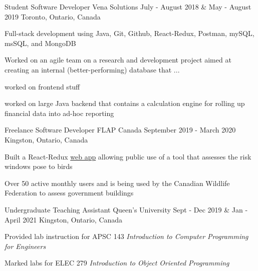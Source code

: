 \begin{cventries}
  \cventry
    {Student Software Developer} %
    {Vena Solutions} %
    {July - August 2018 \& May - August 2019} %
    {Toronto, Ontario, Canada} %
    {
      \begin{cvitems} %
        \item {Full-stack development using Java, Git, Github, React-Redux, Postman, mySQL, msSQL, and MongoDB}
        \item{Worked on an agile team on a research and development project aimed at creating an internal (better-performing) database that ...}
        \item{worked on frontend stuff}
        \item{worked on large Java backend that contains a calculation engine for rolling up financial data into ad-hoc reporting}
      \end{cvitems}
    }

  \cventry
    {Freelance Software Developer} %
    {FLAP Canada} %
    {September 2019 - March 2020} %
    {Kingston, Ontario, Canada} %
    {
      \begin{cvitems} %
        \item {Built a React-Redux \href{https://www.flapapp.ca/}{web app} allowing public use of a tool that assesses the risk windows pose to birds}
        \item{Over 50 active monthly users and is being used by the Canadian Wildlife Federation to assess government buildings}
      \end{cvitems}
    }

  \cventry
    {Undergraduate Teaching Assistant} %
    {Queen's University} %
    {Sept - Dec 2019 \& Jan - April 2021} %
    {Kingston, Ontario, Canada} %
    {
      \begin{cvitems} %
        \item{Provided lab instruction for APSC 143 \textit{Introduction to Computer Programming for Engineers}}
        \item{Marked labs for ELEC 279 \textit{Introduction to Object Oriented Programming}}
      \end{cvitems}
    }


\end{cventries}
